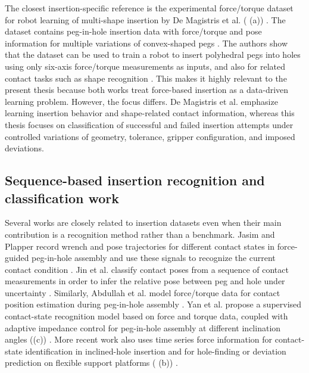 The closest insertion-specific reference is the experimental force/torque dataset for robot learning of multi-shape insertion by De Magistris et al. ( (a)) \cite{magistrisExperimentalForceTorqueDataset2018}. The dataset contains peg-in-hole insertion data with force/torque and pose information for multiple variations of convex-shaped pegs \cite{magistrisExperimentalForceTorqueDataset2018}. The authors show that the dataset can be used to train a robot to insert polyhedral pegs into holes using only six-axis force/torque measurements as inputs, and also for related contact tasks such as shape recognition \cite{magistrisExperimentalForceTorqueDataset2018}. This makes it highly relevant to the present thesis because both works treat force-based insertion as a data-driven learning problem. However, the focus differs. De Magistris et al. emphasize learning insertion behavior and shape-related contact information, whereas this thesis focuses on classification of successful and failed insertion attempts under controlled variations of geometry, tolerance, gripper configuration, and imposed deviations.

\subsection{Sequence-based insertion recognition and classification work}

Several works are closely related to insertion datasets even when their main contribution is a recognition method rather than a benchmark. Jasim and Plapper record wrench and pose trajectories for different contact states in force-guided peg-in-hole assembly and use these signals to recognize the current contact condition \cite{jasimContactstateMonitoringForceguided2014}. Jin et al. classify contact poses from a sequence of contact measurements in order to infer the relative pose between peg and hole under uncertainty \cite{jinContactPoseIdentification2021a}. Similarly, Abdullah et al. model force/torque data for contact position estimation during peg-in-hole assembly \cite{abdullahForceTorqueData2015}. Yan et al. propose a supervised contact-state recognition model based on force and torque data, coupled with adaptive impedance control for peg-in-hole assembly at different inclination angles ((c)) \cite{yanLearningbasedContactStatus2021}. More recent work also uses time series force information for contact-state identification in inclined-hole insertion \cite{shenLearningbasedRobotAssembly2025} and for hole-finding or deviation prediction on flexible support platforms ( (b)) \cite{xiongDeepLearningbasedHolefinding2026}.


